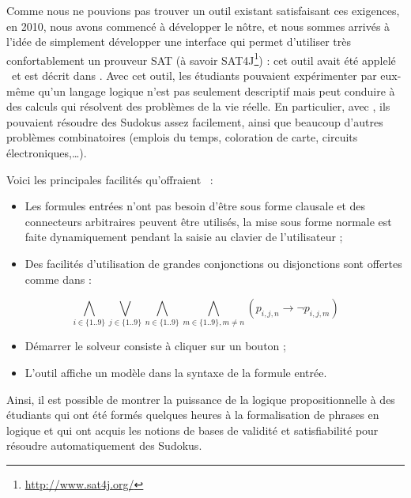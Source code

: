 Comme nous ne pouvions pas trouver un outil existant satisfaisant ces exigences, en 2010, nous avons commenc\'e \`a d\'evelopper le n\^otre, et nous sommes arriv\'es \`a l'id\'ee de simplement d\'evelopper une interface qui permet d'utiliser tr\`es confortablement un prouveur SAT (\`a savoir SAT4J\footnote{\url{http://www.sat4j.org/}}) : cet outil avait \'et\'e applel\'e \satoulouse\ et est d\'ecrit dans \cite{GaScSt2011}. Avec cet outil, les \'etudiants pouvaient exp\'erimenter par eux-m\^eme qu'un langage logique n'est pas seulement descriptif mais peut conduire \`a des calculs qui r\'esolvent des probl\`emes de la vie r\'eelle. En particulier, avec \satoulouse, ils pouvaient r\'esoudre des Sudokus assez facilement, ainsi que beaucoup d'autres probl\`emes combinatoires (emplois du temps, coloration de carte, circuits \'electroniques,\ldots).\

Voici les principales facilit\'es qu'offraient \satoulouse\ :
\begin{itemize}
\item Les formules entr\'ees n'ont pas besoin d'\^etre sous forme clausale et des connecteurs arbitraires peuvent \^etre utilis\'es, la mise sous forme normale est faite dynamiquement pendant la saisie au clavier de l'utilisateur ;
\item Des facilit\'es d'utilisation de grandes conjonctions ou disjonctions sont offertes comme dans :
\end{itemize}
  \[\bigwedge_{i\in\{1..9\}}
  \bigvee_{j\in\{1..9\}}\bigwedge_{n\in\{1..9\}}\bigwedge_{m\in\{1..9\},m\neq
    n}(p_{i,j,n}\rightarrow \lnot p_{i,j,m})\]
\begin{itemize}
\item D\'emarrer le solveur consiste \`a cliquer sur un bouton ;
\item L'outil affiche un mod\`ele dans la syntaxe de la formule entr\'ee.
\end{itemize}
Ainsi, il est possible de montrer la puissance de la logique propositionnelle \`a des \'etudiants qui ont \'et\'e form\'es quelques heures \`a la formalisation de phrases en logique et qui ont acquis les notions de bases de validit\'e et satisfiabilit\'e pour r\'esoudre automatiquement des Sudokus.\

 
